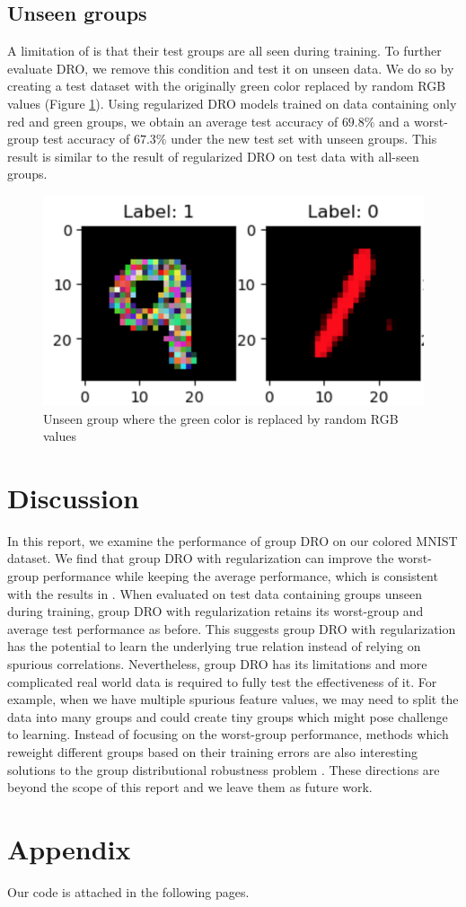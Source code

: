 \documentclass{article}
\begin{document}
\subsection{Unseen groups}
A limitation of \cite{groupdro} is that their test groups are all seen during training. To further evaluate DRO, we remove this condition and test it on unseen data. We do so by creating a test dataset with the originally green color replaced by random RGB values (Figure \ref{fig:unseen}). Using regularized DRO models trained on data containing only red and green groups, we obtain an average test accuracy of $69.8\%$ and a worst-group test accuracy of $67.3\%$ under the new test set with unseen groups. This result is similar to the result of regularized DRO on test data with all-seen groups. 

\begin{figure}[h]
\centering
\includegraphics[scale=0.4]{images/unseen.png}
\caption{Unseen group where the green color is replaced by random RGB values}
\label{fig:unseen}
\end{figure}

\section{Discussion}
In this report, we examine the performance of group DRO on our colored MNIST dataset. We find that group DRO with regularization can improve the worst-group performance while keeping the average performance, which is consistent with the results in \cite{groupdro}. When evaluated on test data containing groups unseen during training, group DRO with regularization retains its worst-group and average test performance as before. This suggests group DRO with regularization has the potential to learn the underlying true relation instead of relying on spurious correlations. Nevertheless, group DRO has its limitations and more complicated real world data is required to fully test the effectiveness of it. For example, when we have multiple spurious feature values, we may need to split the data into many groups and could create tiny groups which might pose challenge to learning. Instead of focusing on the worst-group performance, methods which reweight different groups based on their training errors are also interesting solutions to the group distributional robustness problem \cite{liu2023ranking}. These directions are beyond the scope of this report and we leave them as future work.

\printbibliography

\section*{Appendix}
Our code is attached in the following pages.
\end{document}

